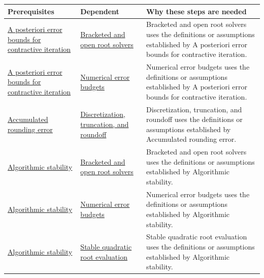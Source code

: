 {\def\LTcaptype{none} %
\begin{longtable}[]{@{}
  >{\raggedright\arraybackslash}p{}
  >{\raggedright\arraybackslash}p{}
  >{\raggedright\arraybackslash}p{}@{}}
\toprule\noalign{}
\begin{minipage}[b]{\linewidth}\raggedright
Prerequisites
\end{minipage} & \begin{minipage}[b]{\linewidth}\raggedright
Dependent
\end{minipage} & \begin{minipage}[b]{\linewidth}\raggedright
Why these steps are needed
\end{minipage} \\
\midrule\noalign{}
\endhead
\bottomrule\noalign{}
\endlastfoot
\hyperref[appendix-d83b0ad1be7f]{A posteriori error bounds for contractive iteration} & \hyperref[appendix-f63eb850796d]{Bracketed and open root solvers} & Bracketed and open root solvers uses the definitions or assumptions established by A posteriori error bounds for contractive iteration. \\
\hyperref[appendix-d83b0ad1be7f]{A posteriori error bounds for contractive iteration} & \hyperref[appendix-31b8c295e05f]{Numerical error budgets} & Numerical error budgets uses the definitions or assumptions established by A posteriori error bounds for contractive iteration. \\
\hyperref[appendix-f82e270791c8]{Accumulated rounding error} & \hyperref[appendix-6b0648b2b8e8]{Discretization, truncation, and roundoff} & Discretization, truncation, and roundoff uses the definitions or assumptions established by Accumulated rounding error. \\
\hyperref[appendix-aa2bf0d79639]{Algorithmic stability} & \hyperref[appendix-f63eb850796d]{Bracketed and open root solvers} & Bracketed and open root solvers uses the definitions or assumptions established by Algorithmic stability. \\
\hyperref[appendix-aa2bf0d79639]{Algorithmic stability} & \hyperref[appendix-31b8c295e05f]{Numerical error budgets} & Numerical error budgets uses the definitions or assumptions established by Algorithmic stability. \\
\hyperref[appendix-aa2bf0d79639]{Algorithmic stability} & \hyperref[appendix-b9afba7f63e5]{Stable quadratic root evaluation} & Stable quadratic root evaluation uses the definitions or assumptions established by Algorithmic stability. \\

\end{longtable}}
